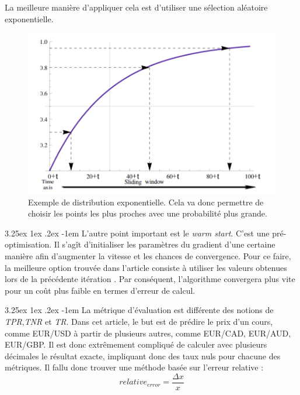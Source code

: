 \documentclass[a4paper, 11pt]{article}
\makeatletter
\renewcommand\paragraph{\@startsection{paragraph}{5}{\z@}%
  {3.25ex \@plus1ex \@minus.2ex}%
  {-1em}%
  {\normalfont\normalsize\bfseries}}
\makeatother
\begin{document}
La meilleure manière d'appliquer cela est d'utiliser une sélection aléatoire exponentielle.

\begin{figure}[H]
\centering
\includegraphics[scale=0.40]{images/choix_exp}
\caption[]{Exemple de distribution exponentielle\footnotemark.
Cela va donc permettre de choisir les points les plus proches avec une probabilité plus grande.}
\end{figure}


\paragraph{}
L'autre point important est le \textit{warm start}. C'est une pré-optimisation.
Il s'agît d'initialiser les paramètres du gradient d'une certaine manière afin d'augmenter la vitesse et les chances
de convergence. Pour ce faire, la meilleure option trouvée dans l'article consiste à utiliser les valeurs obtenues lors de la précédente itération
\cite{descente_du_gradient_stochastique}.
Par conséquent, l'algorithme convergera plus vite pour un coût plus faible en termes d'erreur de calcul.

\paragraph{}
La métrique d'évaluation est différente des notions de \textit{TPR},\textit{TNR} et \textit{TR}.
Dans cet article, le but est de prédire le prix d'un cours, comme EUR/USD à partir de plusieurs autres,
comme EUR/CAD, EUR/AUD, EUR/GBP. Il est donc extrêmement compliqué de calculer avec plusieurs décimales
le résultat exacte, impliquant donc des taux nuls pour chacune des métriques.
Il fallu donc trouver une méthode basée sur l'erreur relative :
$$relative_{error} = \frac{\Delta x}{x}$$
\end{document}
